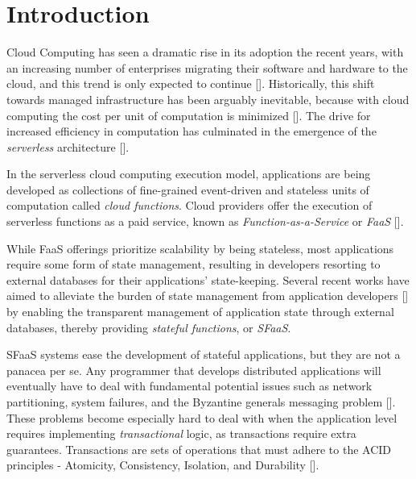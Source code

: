 
\chapter{Introduction}

\label{Chapter1}

Cloud Computing has seen a dramatic rise in its adoption the recent years, with an increasing number of enterprises migrating their software and hardware to the cloud, and this trend is only expected to continue [\cite{serverless-preds}].
Historically, this shift towards managed infrastructure has been arguably inevitable, because with cloud computing the cost per unit of computation is minimized [\cite{rise-of-serverless}].
The drive for increased efficiency in computation has culminated in the emergence of the \textit{serverless} architecture [\cite{serverless-definition}].

In the serverless cloud computing execution model, applications are being developed as collections of fine-grained event-driven and stateless units of computation called \textit{cloud functions}.
Cloud providers offer the execution of serverless functions as a paid service, known as \textit{Function-as-a-Service} or \textit{FaaS} [\cite{faas-definition}].

While FaaS offerings prioritize scalability by being stateless, most applications require some form of state management, resulting in developers resorting to external databases for their applications' state-keeping.
Several recent works have aimed to alleviate the burden of state management from application developers [\cite{orleans,durable-functions,beldi}] by enabling the transparent management of application state through external databases, thereby providing \textit{stateful functions}, or \textit{SFaaS}.

SFaaS systems ease the development of stateful applications, but they are not a panacea per se.
Any programmer that develops distributed applications will eventually have to deal with fundamental potential issues such as network partitioning, system failures, and the Byzantine generals messaging problem [\cite{byzantine}].
These problems become especially hard to deal with when the application level requires implementing \textit{transactional} logic, as transactions require extra guarantees. Transactions are sets of operations that must adhere to the ACID principles - Atomicity, Consistency, Isolation, and Durability [\cite{transaction-definition}]. 

